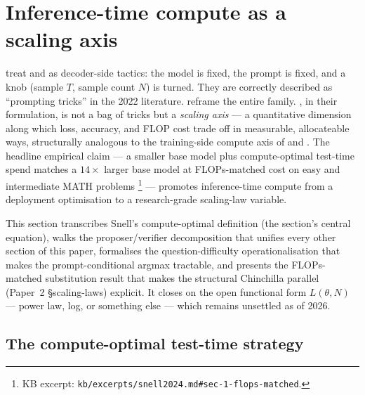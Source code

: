 
\section{Inference-time compute as a scaling axis}
\label{sec:inference-compute-scaling}
\label{sec:inference-compute-axis}
\label{sec:test-time-compute}

 treat  and
 as decoder-side tactics: the model is fixed, the prompt
is fixed, and a knob (sample $T$, sample count $N$) is turned. They are
correctly described as ``prompting tricks'' in the 2022 literature.
\citet{snell2024} reframe the entire family. , in
their formulation, is not a bag of tricks but a \emph{scaling axis} ---
a quantitative dimension along which loss, accuracy, and FLOP cost trade
off in measurable, allocateable ways, structurally analogous to the
training-side compute axis of \citet{kaplan2020} and
\citet{hoffmann2022-chinchilla}. The headline empirical claim --- a
smaller base model plus compute-optimal test-time spend matches a
$14\times$ larger base model at FLOPs-matched cost on easy and
intermediate MATH problems
\citep[\S 1, \S 6]{snell2024}\footnote{KB excerpt:
\nolinkurl{kb/excerpts/snell2024.md#sec-1-flops-matched}.} --- promotes
inference-time compute from a deployment optimisation to a research-grade
scaling-law variable.

This section transcribes Snell's compute-optimal definition (the section's
central equation), walks the proposer/verifier decomposition that
unifies every other section of this paper, formalises the
question-difficulty operationalisation that makes the
prompt-conditional argmax tractable, and presents the FLOPs-matched
substitution result that makes the structural Chinchilla parallel
(Paper~2 \S scaling-laws) explicit. It closes on the open functional
form $L(\theta, N)$ --- power law, log, or something else --- which
remains unsettled as of 2026.

\subsection{The compute-optimal test-time strategy}
\label{sec:snell-compute-optimal}

